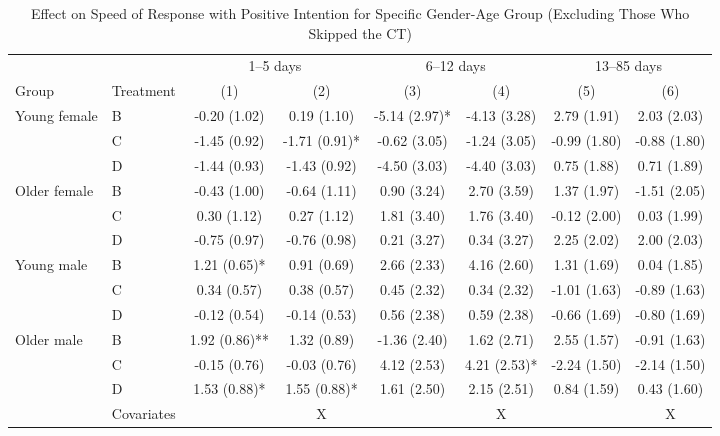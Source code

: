 \documentclass[12pt, a4paper]{article}
\begin{document}
\begin{table}[H]

\caption{\label{tab:lh-interaction-gender-age-int-time-decompose-noskip}Effect on Speed of Response with Positive Intention for Specific Gender-Age Group (Excluding Those Who Skipped the CT)}
\centering
\fontsize{8}{10}\selectfont
\begin{threeparttable}
\begin{tabular}[t]{llcccccc}
\toprule
\multicolumn{2}{c}{ } & \multicolumn{2}{c}{1--5 days} & \multicolumn{2}{c}{6--12 days} & \multicolumn{2}{c}{13--85 days} \\
\cmidrule(l{3pt}r{3pt}){3-4} \cmidrule(l{3pt}r{3pt}){5-6} \cmidrule(l{3pt}r{3pt}){7-8}
Group & Treatment & (1) & (2) & (3) & (4) & (5) & (6)\\
\midrule
Young female & B & -0.20 (1.02) & 0.19 (1.10) & -5.14 (2.97)* & -4.13 (3.28) & 2.79 (1.91) & 2.03 (2.03)\\
 & C & -1.45 (0.92) & -1.71 (0.91)* & -0.62 (3.05) & -1.24 (3.05) & -0.99 (1.80) & -0.88 (1.80)\\
 & D & -1.44 (0.93) & -1.43 (0.92) & -4.50 (3.03) & -4.40 (3.03) & 0.75 (1.88) & 0.71 (1.89)\\
Older female & B & -0.43 (1.00) & -0.64 (1.11) & 0.90 (3.24) & 2.70 (3.59) & 1.37 (1.97) & -1.51 (2.05)\\
 & C & 0.30 (1.12) & 0.27 (1.12) & 1.81 (3.40) & 1.76 (3.40) & -0.12 (2.00) & 0.03 (1.99)\\
 & D & -0.75 (0.97) & -0.76 (0.98) & 0.21 (3.27) & 0.34 (3.27) & 2.25 (2.02) & 2.00 (2.03)\\
Young male & B & 1.21 (0.65)* & 0.91 (0.69) & 2.66 (2.33) & 4.16 (2.60) & 1.31 (1.69) & 0.04 (1.85)\\
 & C & 0.34 (0.57) & 0.38 (0.57) & 0.45 (2.32) & 0.34 (2.32) & -1.01 (1.63) & -0.89 (1.63)\\
 & D & -0.12 (0.54) & -0.14 (0.53) & 0.56 (2.38) & 0.59 (2.38) & -0.66 (1.69) & -0.80 (1.69)\\
Older male & B & 1.92 (0.86)** & 1.32 (0.89) & -1.36 (2.40) & 1.62 (2.71) & 2.55 (1.57) & -0.91 (1.63)\\
 & C & -0.15 (0.76) & -0.03 (0.76) & 4.12 (2.53) & 4.21 (2.53)* & -2.24 (1.50) & -2.14 (1.50)\\
 & D & 1.53 (0.88)* & 1.55 (0.88)* & 1.61 (2.50) & 2.15 (2.51) & 0.84 (1.59) & 0.43 (1.60)\\
\midrule
 & Covariates &  & X &  & X &  & X\\
\bottomrule
\end{tabular}

\end{threeparttable}
\end{table}
\end{document}
